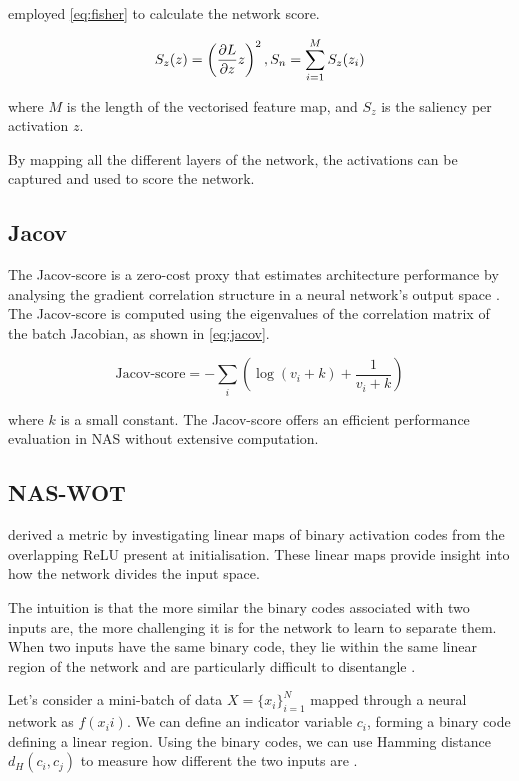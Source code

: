 \cite{DBLP:journals/corr/abs-1801-05787} employed \cref{eq:fisher} to calculate the network score. 

\begin{equation}
    \centering
    S_z(z) = \left(\frac{\partial L}{\partial z}z\right)^2, S_n = \sum_{i=1}^M S_z(z_i)
    \label{eq:fisher}
\end{equation}

where $M$ is the length of the vectorised feature map, and  $S_z$ is the saliency per activation $z$. 

By mapping all the different layers of the network, the activations can be captured and used to score the network.  

\subsection{Jacov}
The Jacov-score is a zero-cost proxy that estimates architecture performance by analysing the gradient correlation structure in a neural network's output space \autocite{jacob_conv}. The Jacov-score is computed using the eigenvalues of the correlation matrix of the batch Jacobian, as shown in \cref{eq:jacov}. 

\begin{equation}
\text{Jacov-score}=-\sum_i \left( \log(v_i+k)+\frac{1}{v_i+k}\right)
\label{eq:jacov}
\end{equation}

where $k$ is a small constant. The Jacov-score offers an efficient performance evaluation in \gls{NAS} without extensive computation.


\subsection{NAS-WOT}

\autocite{jacob_conv} derived a metric by investigating linear maps of binary activation codes from the overlapping ReLU present at initialisation. These linear maps provide insight into how the network divides the input space.

The intuition is that the more similar the binary codes associated with two inputs are, the more challenging it is for the network to learn to separate them. When two inputs have the same binary code, they lie within the same linear region of the network and are particularly difficult to disentangle \autocite{jacob_conv}.

Let's consider a mini-batch of data $X = \{x_i\}^N_{i=1}$ mapped through a neural network as $f(x_ii)$. We can define an indicator variable $c_i$, forming a binary code defining a linear region. Using the binary codes, we can use Hamming distance $d_H(c_i, c_j)$ to measure how different the two inputs are \autocite{jacob_conv}.

